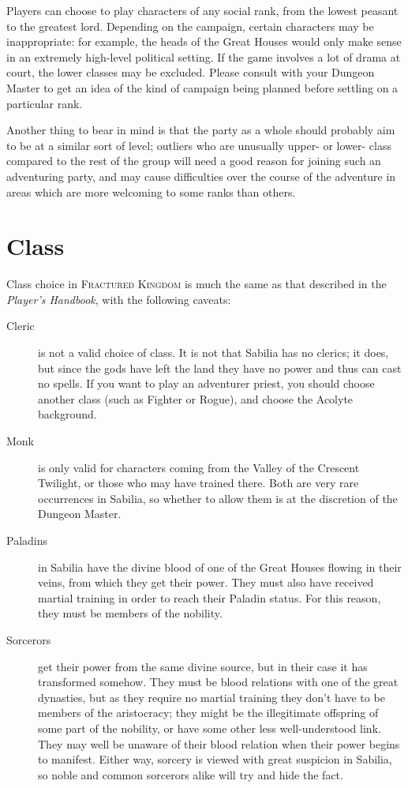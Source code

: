 \documentclass[10pt,twoside,openright,a4paper,twocolumn]{book}
\begin{document}
Players can choose to play characters of any social rank, from the lowest
peasant to the greatest lord.  Depending on the campaign, certain characters
may be inappropriate: for example, the heads of the Great Houses would only
make sense in an extremely high-level political setting.  If the game involves
a lot of drama at court, the lower classes may be excluded.  Please consult
with your Dungeon Master to get an idea of the kind of campaign being planned
before settling on a particular rank.

Another thing to bear in mind is that the party as a whole should probably aim
to be at a similar sort of level; outliers who are unusually upper- or lower-
class compared to the rest of the group will need a good reason for joining
such an adventuring party, and may cause difficulties over the course of the
adventure in areas which are more welcoming to some ranks than others.

\section{Class}

Class choice in \textsc{Fractured Kingdom} is much the same as that described in
the \textit{Player's Handbook}, with the following caveats:

\begin{description}
\item [Cleric] is not a valid choice of class. It is not that Sabilia has no
clerics; it does, but since the gods have left the land they have no power and
thus can cast no spells.  If you want to play an adventurer priest, you should
choose another class (such as Fighter or Rogue), and choose the Acolyte
background.

\item [Monk] is only valid for characters coming from the Valley of the
Crescent Twilight, or those who may have trained there.  Both are very rare
occurrences in Sabilia, so whether to allow them is at the discretion of the
Dungeon Master.

\item [Paladins] in Sabilia have the divine blood of one of the Great Houses
flowing in their veins, from which they get their power.  They must also have
received martial training in order to reach their Paladin status.  For this
reason, they must be members of the nobility.

\item [Sorcerors] get their power from the same divine source, but in their
case it has transformed somehow.  They must be blood relations with one of the
great dynasties, but as they require no martial training they don't have to be
members of the aristocracy; they might be the illegitimate offspring of some
part of the nobility, or have some other less well-understood link.  They may
well be unaware of their blood relation when their power begins to manifest.
Either way, sorcery is viewed with great suspicion in Sabilia, so noble and
common sorcerors alike will try and hide the fact.
\end{description}
\end{document}
